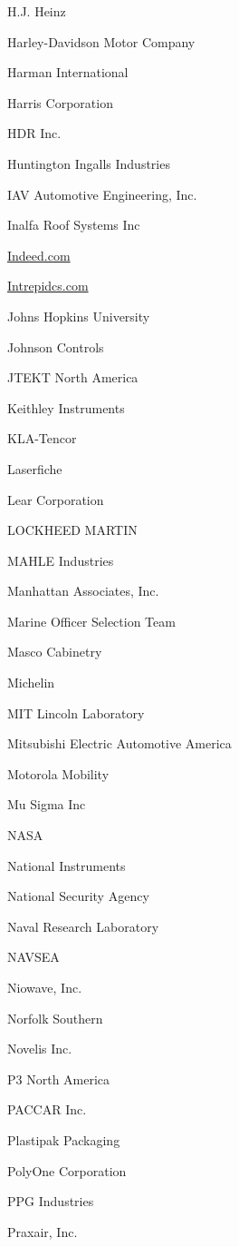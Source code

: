 \documentclass[twoside]{article}
\begin{document}
\begin{center}
\begin{multicols}{5}
\begin{FlushLeft}
\begin{compactitem}
\item H.J. Heinz
\item Harley-Davidson Motor Company
\item Harman International
\item Harris Corporation
\item HDR Inc.
\item Huntington Ingalls Industries
\item IAV Automotive Engineering, Inc.
\item Inalfa Roof Systems Inc
\item \url{Indeed.com}
\item \url{Intrepidcs.com}
\item Johns Hopkins University
\item Johnson Controls
\item JTEKT North America
\item Keithley Instruments
\item KLA-Tencor
\item Laserfiche
\item Lear Corporation
\item LOCKHEED MARTIN
\item MAHLE Industries
\item Manhattan Associates, Inc.
\item Marine Officer Selection Team
\item Masco Cabinetry
\item Michelin
\item MIT Lincoln Laboratory
\item Mitsubishi Electric Automotive America
\item Motorola Mobility
\item Mu Sigma Inc
\item NASA
\item National Instruments
\item National Security Agency
\item Naval Research Laboratory
\item NAVSEA
\item Niowave, Inc.
\item Norfolk Southern
\item Novelis Inc.
\item P3 North America
\item PACCAR Inc.
\item Plastipak Packaging
\item PolyOne Corporation
\item PPG Industries
\item Praxair, Inc.

\end{compactitem}
\end{FlushLeft}
\end{multicols}
\end{center}
\end{document}
